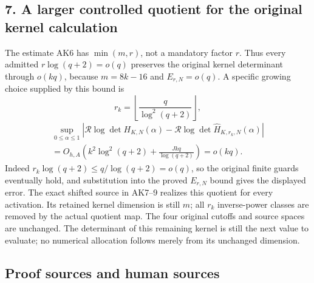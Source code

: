 \subsection{7. A larger controlled quotient for the original kernel calculation}\label{a-larger-controlled-quotient-for-the-original-kernel-calculation}

The estimate AK6 has \(\min(m,r)\), not a mandatory factor \(r\). Thus every admitted \(r\log(q+2)=o(q)\) preserves the original kernel determinant through \(o(kq)\), because \(m=8k-16\) and \(E_{r,N}=o(q)\). A specific growing choice supplied by this bound is \[
r_k=\left\lfloor\frac{q}{\log^2(q+2)}\right\rfloor,
\] \[
\begin{gathered}
\sup_{0\le\alpha\le1}
\left|\mathcal R\log\det H_{K,N}(\alpha)
-\mathcal R\log\det\widehat H_{K,r_k,N}(\alpha)\right|\\
=O_{h,A}\!\left(k^2\log^2(q+2)+\frac{Jkq}{\log(q+2)}\right)=o(kq).
\end{gathered}
\tag{AK20}
\] Indeed \(r_k\log(q+2)\le q/\log(q+2)=o(q)\), so the original finite guards eventually hold, and substitution into the proved \(E_{r,N}\) bound gives the displayed error. The exact shifted source in AK7--9 realizes this quotient for every activation. Its retained kernel dimension is still \(m\); all \(r_k\) inverse-power classes are removed by the actual quotient map. The four original cutoffs and source spaces are unchanged. The determinant of this remaining kernel is still the next value to evaluate; no numerical allocation follows merely from its unchanged dimension.

\subsection{Proof sources and human sources}\label{proof-sources-and-human-sources}


